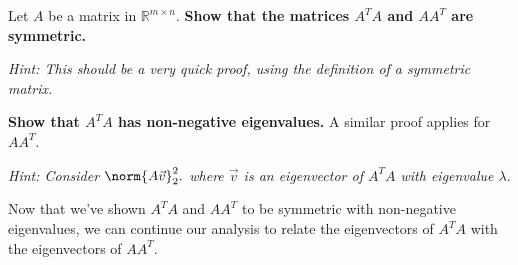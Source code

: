 \begin{enumerate}

  \qitem Let $A$ be a matrix in $\mathbb{R}^{m \times n}$. \textbf{Show that the matrices $A^T A$ and $A A^T$ are symmetric.}
  
  \textit{Hint: This should be a very quick proof, using the definition of a symmetric matrix.}

  \ws{\vspace{50px}}

  \qitem \textbf{Show that $A^T A$ has non-negative eigenvalues.} A similar proof applies for $A A^T$.

  \textit{Hint: Consider $\norm{A\vec{v}}_{2}^{2}.$ where $\vec{v}$ is an eigenvector of $A^{T}A$ with eigenvalue $\lambda.$}

  \ws{\vspace{75px}}

\end{enumerate}

Now that we've shown $A^T A$ and $A A^T$ to be symmetric with non-negative eigenvalues, we can continue our analysis to relate the eigenvectors of $A^T A$ with the eigenvectors of $A A^T$.

